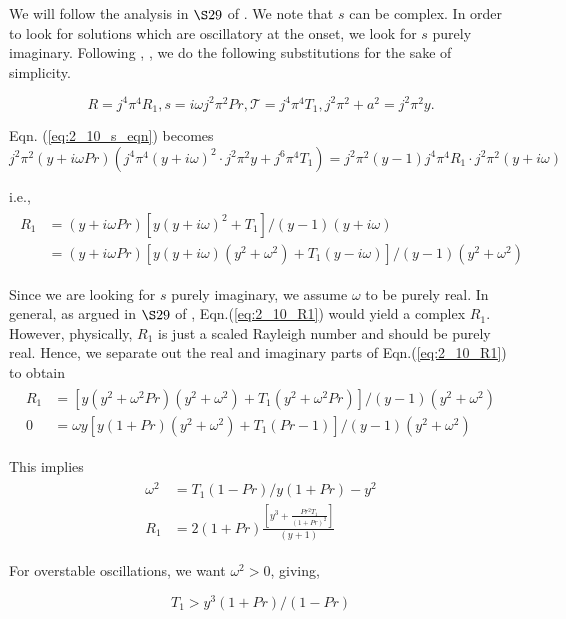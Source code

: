 We will follow the analysis in $\S 29$ of \cite{chandrasekhar1961hydrodynamic}. We note that $s$ can be complex. In order to look for solutions which are oscillatory at the onset, we look for $s$ purely imaginary. Following \cite{chandrasekhar1961hydrodynamic}, \cite{drazin2004hydrodynamic}, we do the following substitutions for the sake of simplicity. 

\begin{equation}\label{eq:2_10_substitutions}
 R = j^{4}\pi^{4}R_{1}, s = i \omega j^{2}\pi^{2} Pr, \mathcal{T} = j^{4}\pi^{4}T_{1}, j^{2}\pi^{2} + a^{2} = j^{2}\pi^{2} y.
\end{equation}

Eqn. (\ref{eq:2_10_s_eqn}) becomes
\begin{equation*}
 j^{2}\pi^{2}(y + i\omega Pr)\left(j^{4}\pi^{4}(y + i\omega)^{2} \cdot j^{2}\pi^{2}y + j^{6}\pi^{4}T_{1}\right) = j^{2}\pi^{2} (y-1)j^{4}\pi^{4}R_{1}\cdot j^{2}\pi^{2}(y + i\omega) 
\end{equation*}

i.e.,
\begin{align}\label{eq:2_10_R1}
 \begin{split}
  R_{1} &= (y + i\omega Pr)\left[y(y + i\omega)^{2} + T_{1} \right]/(y-1)(y+i\omega) \\
  & = (y + i\omega Pr)\left[y(y + i\omega)(y^{2}+\omega^{2}) + T_{1}(y-i\omega)\right]/(y-1)(y^{2}+\omega^{2})
 \end{split}
\end{align}

Since we are looking for $s$ purely imaginary, we assume $\omega$ to be purely real. In general, as argued in $\S 29$ of \cite{chandrasekhar1961hydrodynamic}, Eqn.(\ref{eq:2_10_R1}) would yield a complex $R_{1}$. However, physically, $R_{1}$ is just a scaled Rayleigh number and should be purely real. Hence, we separate out the real and imaginary parts of Eqn.(\ref{eq:2_10_R1}) to obtain
\begin{align}\label{eq:2_10_R1_re_im}
 \begin{split}
  R_{1} &= \left[y(y^{2} + \omega^{2}Pr) (y^{2}+\omega^{2}) + T_{1}(y^{2} + \omega^{2}Pr)\right]/(y-1)(y^{2}+\omega^{2})\\
  0 &= \omega y \left[y(1 + Pr)(y^{2}+\omega^{2}) + T_{1}(Pr - 1) \right]/(y-1)(y^{2}+\omega^{2})
 \end{split}
\end{align}

This implies
\begin{align}\label{eq:2_10_omega_R1_expressions}
 \begin{split}
  \omega^{2} &= T_{1}(1-Pr)/y(1+Pr) - y^{2}\\
  R_{1} &= 2(1+Pr) \frac{\left[y^{3} + \frac{Pr^{2}T_{1}}{(1+Pr)^{2}} \right]}{(y+1)}
 \end{split}
\end{align}

For overstable oscillations, we want $\omega^{2} > 0$, giving, 

\begin{equation}\label{eq:2_10_overstability_cond}
 \boxed{
 T_{1} > y^{3} (1+Pr)/(1-Pr)
 }
\end{equation}



